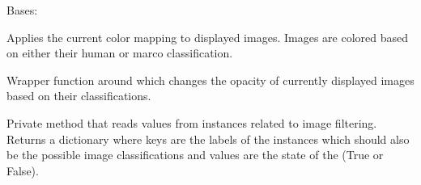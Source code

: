 \documentclass[letterpaper,10pt,english]{sphinxmanual}
\begin{document}
\begin{fulllineitems}
\label{\detokenize{polo.widgets:polo.widgets.plate_inspector_widget.PlateInspectorWidget}}
Bases: 

\begin{fulllineitems}
\label{\detokenize{polo.widgets:polo.widgets.plate_inspector_widget.PlateInspectorWidget._apply_color_mapping}}
Applies the current color mapping to displayed images. Images
are colored based on either their human or marco classification.

\end{fulllineitems}


\begin{fulllineitems}
\label{\detokenize{polo.widgets:polo.widgets.plate_inspector_widget.PlateInspectorWidget._apply_image_filters}}
Wrapper function around 
which changes the opacity of currently displayed images based on
their classifications.

\end{fulllineitems}


\begin{fulllineitems}
\label{\detokenize{polo.widgets:polo.widgets.plate_inspector_widget.PlateInspectorWidget._parse_label_checkboxes}}
Private method that reads values from 
instances related to image filtering.
Returns a dictionary where keys are the labels of the  instances
which should also be the possible image classifications and values
are the state of the  (True or False).


\end{fulllineitems}
\end{fulllineitems}
\end{document}
